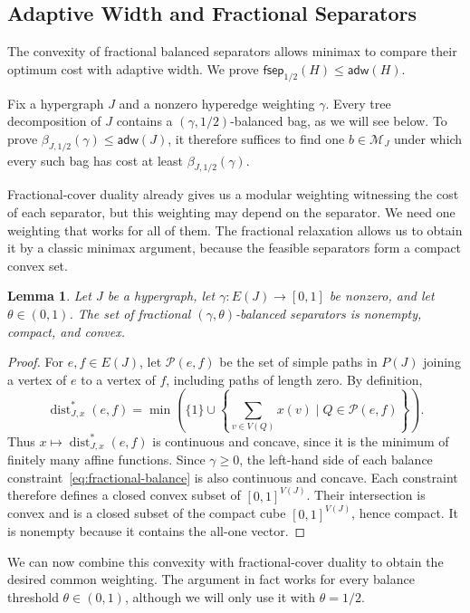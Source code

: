 \documentclass[11pt,letterpaper]{article}
\newtheorem{lemma}[lemma]{Lemma}
\theoremstyle{definition}
\theoremstyle{remark}
\newcommand{\adw}{\mathsf{adw}}
\newcommand{\fsep}{\mathsf{fsep}}
\providecommand{\adw}{\operatorname{adw}}
\begin{document}
\subsection{Adaptive Width and Fractional Separators}
\label{sec:adaptive}

The convexity of fractional balanced separators allows minimax to compare
their optimum cost with adaptive width. We prove
$\fsep_{1/2}(H)\le\adw(H)$.

Fix a hypergraph $J$ and a nonzero hyperedge weighting $\gamma$.
Every tree decomposition of $J$ contains a $(\gamma,1/2)$-balanced bag,
as we will see below. To prove
$\beta_{J,1/2}(\gamma)\le\adw(J)$, it therefore suffices to find one
$b\in\mathcal M_J$ under which every such bag has cost at least
$\beta_{J,1/2}(\gamma)$.

Fractional-cover duality already gives us a modular weighting witnessing
the cost of each separator, but this weighting may depend on the separator.
We need one weighting that works for all of them. The fractional relaxation
allows us to obtain it by a classic minimax argument, because the feasible
separators form a compact convex set.

\begin{lemma}
\label{lem:fractional-separator-convexity}
Let $J$ be a hypergraph, let $\gamma:E(J)\to[0,1]$ be nonzero, and let
$\theta\in(0,1)$. The set of fractional
$(\gamma,\theta)$-balanced separators is nonempty, compact, and convex.
\end{lemma}

\begin{proof}
For $e,f\in E(J)$, let $\mathcal P(e,f)$ be the set of simple paths in
$P(J)$ joining a vertex of $e$ to a vertex of $f$, including paths of
length zero. By definition,
\[
 \operatorname{dist}_{J,x}^*(e,f)
 =\min\left(
    \{1\}\cup
    \left\{\sum_{v\in V(Q)}x(v)\mid Q\in\mathcal P(e,f)\right\}
   \right).
\]
Thus $x\mapsto\operatorname{dist}_{J,x}^*(e,f)$ is continuous and concave,
since it is the minimum of finitely many affine functions. Since $\gamma\ge0$,
the left-hand side of each balance constraint~\eqref{eq:fractional-balance}
is also continuous and concave. Each constraint therefore defines a closed
convex subset of $[0,1]^{V(J)}$. Their intersection is convex and is a closed
subset of the compact cube $[0,1]^{V(J)}$, hence compact. It is nonempty
because it contains the all-one vector.
\end{proof}

We can now combine this convexity with fractional-cover duality to obtain
the desired common weighting. The argument in fact works for every balance
threshold $\theta\in(0,1)$, although we will only use it with $\theta=1/2$.
\end{document}

